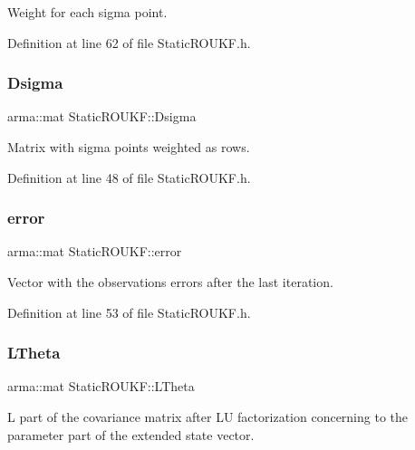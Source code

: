 Weight for each sigma point. 

Definition at line 62 of file Static\+R\+O\+U\+K\+F.\+h.

\mbox{\label{classStaticROUKF_a23471ddebcf45d3d2c6a0867ac47bde3}} 
\subsubsection{\texorpdfstring{Dsigma}{Dsigma}}
{\footnotesize\ttfamily arma\+::mat Static\+R\+O\+U\+K\+F\+::\+Dsigma\hspace{0.3cm}{\ttfamily [private]}}

Matrix with sigma points weighted as rows. 

Definition at line 48 of file Static\+R\+O\+U\+K\+F.\+h.

\mbox{\label{classStaticROUKF_ab4f563a81a206f47c1b60e3b0e80f356}} 
\subsubsection{\texorpdfstring{error}{error}}
{\footnotesize\ttfamily arma\+::mat Static\+R\+O\+U\+K\+F\+::error\hspace{0.3cm}{\ttfamily [private]}}

Vector with the observations errors after the last iteration. 

Definition at line 53 of file Static\+R\+O\+U\+K\+F.\+h.

\mbox{\label{classStaticROUKF_abbdca814d9577bf7b9f34264cb1f6836}} 
\subsubsection{\texorpdfstring{L\+Theta}{LTheta}}
{\footnotesize\ttfamily arma\+::mat Static\+R\+O\+U\+K\+F\+::\+L\+Theta\hspace{0.3cm}{\ttfamily [private]}}

L part of the covariance matrix after LU factorization concerning to the parameter part of the extended state vector. 

